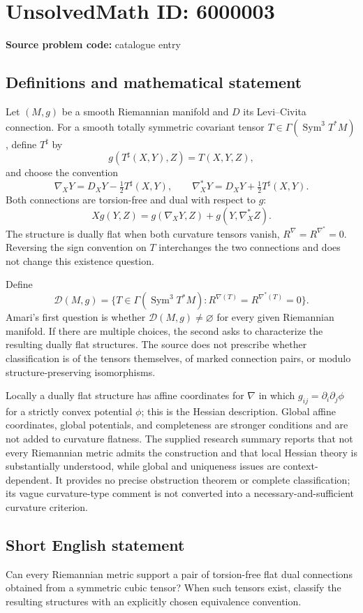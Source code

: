\documentclass[11pt]{article}
\begin{document}
\section*{UnsolvedMath ID: 6000003}
\textbf{Source problem code:} catalogue entry
\subsection{Definitions and mathematical statement}
Let \((M,g)\) be a smooth Riemannian manifold and \(D\) its Levi--Civita connection. For a smooth totally symmetric covariant tensor \(T\in\Gamma(\operatorname{Sym}^3T^*M)\), define \(T^\sharp\) by
\[
g(T^\sharp(X,Y),Z)=T(X,Y,Z),
\]
and choose the convention
\[
\nabla_XY=D_XY-\tfrac12T^\sharp(X,Y),\qquad
\nabla_X^*Y=D_XY+\tfrac12T^\sharp(X,Y).
\]
Both connections are torsion-free and dual with respect to \(g\):
\[
Xg(Y,Z)=g(\nabla_XY,Z)+g(Y,\nabla_X^*Z).
\]
The structure is dually flat when both curvature tensors vanish, \(R^\nabla=R^{\nabla^*}=0\). Reversing the sign convention on \(T\) interchanges the two connections and does not change this existence question.

Define
\[
\mathcal D(M,g)=\{T\in\Gamma(\operatorname{Sym}^3T^*M):
 R^{\nabla(T)}=R^{\nabla^*(T)}=0\}.
\]
Amari's first question is whether \(\mathcal D(M,g)\ne\varnothing\) for every given Riemannian manifold. If there are multiple choices, the second asks to characterize the resulting dually flat structures. The source does not prescribe whether classification is of the tensors themselves, of marked connection pairs, or modulo structure-preserving isomorphisms.

Locally a dually flat structure has affine coordinates for \(\nabla\) in which \(g_{ij}=\partial_i\partial_j\phi\) for a strictly convex potential \(\phi\); this is the Hessian description. Global affine coordinates, global potentials, and completeness are stronger conditions and are not added to curvature flatness. The supplied research summary reports that not every Riemannian metric admits the construction and that local Hessian theory is substantially understood, while global and uniqueness issues are context-dependent. It provides no precise obstruction theorem or complete classification; its vague curvature-type comment is not converted into a necessary-and-sufficient curvature criterion.
\subsection{Short English statement}
Can every Riemannian metric support a pair of torsion-free flat dual connections obtained from a symmetric cubic tensor? When such tensors exist, classify the resulting structures with an explicitly chosen equivalence convention.
\end{document}
